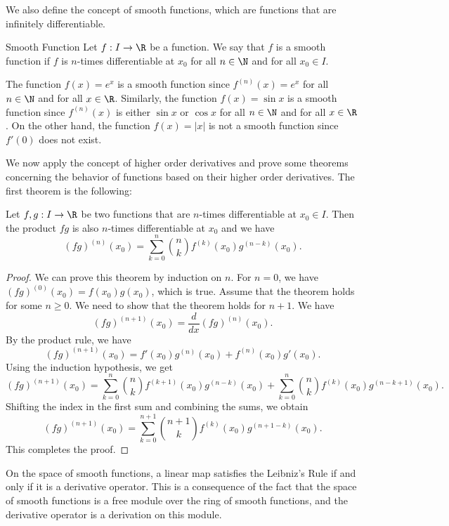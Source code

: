 \documentclass[openany]{book}
\begin{document}
We also define the concept of smooth functions, which are functions that are infinitely differentiable.
\begin{mydefinition}{Smooth Function}
    Let $f: I \to \R$ be a function. We say that $f$ is a smooth function if $f$ is $n$-times differentiable at $x_0$ for all $n \in \N$ and for all $x_0 \in I$.
\end{mydefinition}
\begin{example}
    The function $f(x) = e^x$ is a smooth function since $f^{(n)}(x) = e^x$ for all $n \in \N$ and for all $x \in \R$. Similarly, the function $f(x) = \sin x$ is a smooth function since $f^{(n)}(x)$ is either $\sin x$ or $\cos x$ for all $n \in \N$ and for all $x \in \R$. On the other hand, the function $f(x) = |x|$ is not a smooth function since $f'(0)$ does not exist.
\end{example}
We now apply the concept of higher order derivatives and prove some theorems concerning the behavior of functions based on their higher order derivatives. The first theorem is the following:
\begin{mytheorem}
    Let $f, g: I \to \R$ be two functions that are $n$-times differentiable at $x_0 \in I$. Then the product $f g$ is also $n$-times differentiable at $x_0$ and we have
    \[
        (f g)^{(n)}(x_0) = \sum_{k=0}^n \binom{n}{k} f^{(k)}(x_0) g^{(n-k)}(x_0).
    \]
\end{mytheorem}
\begin{proof}
    We can prove this theorem by induction on $n$. For $n = 0$, we have $(f g)^{(0)}(x_0) = f(x_0) g(x_0)$, which is true. Assume that the theorem holds for some $n \geq 0$. We need to show that the theorem holds for $n + 1$. We have
    \[
        (f g)^{(n+1)}(x_0) = \frac{d}{dx} (f g)^{(n)}(x_0).
    \]
    By the product rule, we have
    \[
        (f g)^{(n+1)}(x_0) = f'(x_0) g^{(n)}(x_0) + f^{(n)}(x_0) g'(x_0).
    \]
    Using the induction hypothesis, we get
    \[
        (f g)^{(n+1)}(x_0) = \sum_{k=0}^n \binom{n}{k} f^{(k+1)}(x_0) g^{(n-k)}(x_0) + \sum_{k=0}^n \binom{n}{k} f^{(k)}(x_0) g^{(n-k+1)}(x_0).
    \]
    Shifting the index in the first sum and combining the sums, we obtain
    \[
        (f g)^{(n+1)}(x_0) = \sum_{k=0}^{n+1} \binom{n+1}{k} f^{(k)}(x_0) g^{(n+1-k)}(x_0).
    \]
    This completes the proof.
\end{proof}
\begin{mynote}
    On the space of smooth functions, a linear map satisfies the Leibniz's Rule if and only if it is a derivative operator. This is a consequence of the fact that the space of smooth functions is a free module over the ring of smooth functions, and the derivative operator is a derivation on this module.
\end{mynote}
\end{document}
